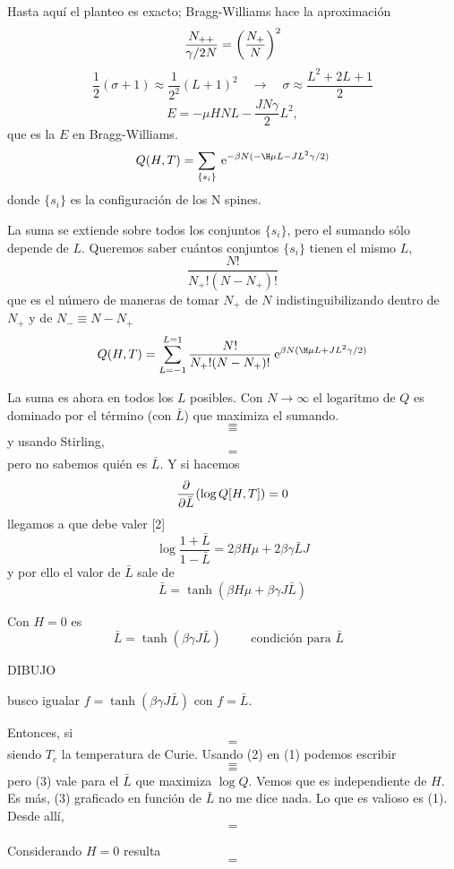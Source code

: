\documentclass[10pt,oneside]{CBFT_book}
\begin{document}
Hasta aquí el planteo es exacto; Bragg-Williams hace la aproximación
\[
	\frac{N_{++}}{\gamma/2 N}= \left( \frac{ N_+ }{ N } \right)^2
\]
\[
	\frac{1}{2}(\sigma + 1) \approx \frac{1}{2^2} (L+1)^2 \quad \rightarrow \quad 
	\sigma \approx \frac{L^2 + 2L + 1}{2}
\]
\[ 
	\boxed{ E = -\mu H N L - \frac{JN\gamma }{2}L^2 },
\]
que es la $E$ en Bragg-Williams.
\[
	Q(H,T) = \sum_{\{ s_i\}} \euler^{-\beta N(- \H\mu L - JL^2 \gamma / 2) }
\]
donde $\{ s_i\}$ es la configuración de los N spines.

La suma se extiende sobre todos los conjuntos $\{ s_i\}$, pero el sumando sólo depende de $L$.
Queremos saber cuántos conjuntos $\{ s_i\}$ tienen el mismo $L$,
\[
	\frac{N!}{N_+!(N-N_+)!}
\]
que es el número de maneras de tomar $N_+$ de $N$ indistinguibilizando dentro de $N_+$ y de $N_-\equiv
N-N_+$
\[
	Q(H,T) = \sum_{L=-1}^{L=1} \frac{N!}{N_+!(N-N_+)!}
	 \euler^{\beta N( \H\mu L + JL^2 \gamma / 2) }
\]

La suma es ahora en todos los $L$ posibles. Con $N\to\infty$ el logaritmo de $Q$ es dominado por el término
(con $\bar{L}$) que maximiza el sumando.
\[=\]
\[=\]
y usando Stirling,
\[=\]
pero no sabemos quién es $\bar{L}$. Y si hacemos
\[
	\frac{\partial^{\hspace{-0.05em}} {}}{\partial {\bar{L}}^{\hspace{-0.05em}}}( \log Q[H,T] ) = 0
\]
llegamos a que debe valer [2]
\[
	\log \frac{1+\bar{L}}{1-\bar{L}} = 2\beta H\mu + 2\beta \gamma \bar{L} J
\]
y por ello el valor de $\bar{L}$ sale de
\[
	\bar{L} = \tanh( \beta H \mu + \beta \gamma J \bar{L} )
\]

Con $H=0$ es 
\[
	\boxed{ \bar{L} = \tanh( \beta \gamma J \bar{L} ) } \qquad \text{ condición para $\bar{L}$ }
\]

DIBUJO 

busco igualar $f=\tanh(\beta\gamma J\bar{L})$ con $f=\bar{L}$.

Entonces, si
\[=\]
siendo $T_c$ la temperatura de Curie.
Usando (2) en (1) podemos escribir 
\[=\]
\[=\]
pero (3) vale para el $\bar{L}$ que maximiza $\log Q$. Vemos que es independiente de $H$.
Es más, (3) graficado en función de $\bar{L}$ no me dice nada. Lo que es valioso es (1).
Desde allí,
\[=\]

Considerando $H=0$ resulta
\[=\]
\end{document}
